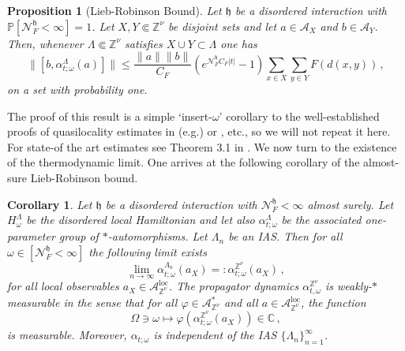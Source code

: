 \documentclass{article}
\newcommand{\calN}{\mathcal{N}^{\mathfrak{h}}_F}
\newcommand{\Znu}{\mathbb{Z}^\nu}
\newcommand{\C}{\mathbb C}
\newcommand{\A}{\mathcal{A}}
\renewcommand{\P}{\mathbb{P}}
\DeclareMathOperator{\loc}{loc}
\newcommand{\aloc}{\mathcal{A}_{\mathbb{Z}^\nu}^{\loc}}
\newcommand{\<}{\langle}
\renewcommand{\>}{\rangle}
\newcommand{\h}{\mathfrak{h}}
\newtheorem{prop}[thm]{Proposition}
\newtheorem{cor}[thm]{Corollary}
\theoremstyle{definition}
\numberwithin{equation}{section}
\begin{document}
\begin{prop}[Lieb-Robinson Bound]\label{prop:disordered_LRB}
    Let $\h$ be a disordered interaction with $\P[\calN<\infty]=1$. Let $X,Y\Subset \Znu$ be disjoint sets and let $a\in \A_{X}$ and $b\in \A_{Y}$. Then, whenever $\Lambda \Subset \Znu$ satisfies $X\cup Y\subset \Lambda$ one has 
    \begin{equation}
        \|[b, \alpha^{\Lambda}_{t;\omega}(a)]\| \le \frac{\|a\| \|b\| }{C_F} (e^{\calN C_F |t| }-1 )\sum_{x\in X} \sum_{y\in Y} F(d(x,y))\,,
    \end{equation} on a set with probability one.
\end{prop}
 The proof of this result is a simple `insert-$\omega$' corollary to the well-established proofs of quasilocality estimates in (e.g.) \cite[Theorem 1]{NachtergaeleOgataSims} or \cite[Theorem 2]{NachtergaeleVershyninaZagrebnov}, etc., so we will not repeat it here. For state-of the art estimates see Theorem 3.1 in \cite{NachtergaeleSimsYoung}. We now turn to the existence of the thermodynamic limit. One arrives at the following corollary of the almost-sure Lieb-Robinson bound.
\begin{cor}\label{cor:Thermo_AS}
    Let $\h$ be a disordered interaction with $\calN<\infty$ almost surely. Let $H^{\Lambda}_\omega$ be the disordered local Hamiltonian and let also $\alpha^{\Lambda}_{t;\omega}$ be the associated one-parameter group of $*$-automorphisms. Let $\Lambda_n$ be an IAS. Then for all $\omega \in [\calN<\infty]$ the following limit exists 
        \begin{equation}
            \lim_{n\to \infty} \alpha^{\Lambda_n}_{t;\omega} (a_X) =: \alpha^{\Znu}_{t;\omega}(a_X)\,,
        \end{equation} for all local observables $a_X\in \aloc$. The propagator dynamics $\alpha^{\Znu}_{t,\omega}$ is weakly-$\ast$ measurable in the sense that for all $\varphi \in \A_{\Znu}^*$ and all $a\in \aloc$, the function 
        \[
            \Omega \ni \omega \mapsto \varphi(\alpha^{\Znu}_{t;\omega}(a_X))\in \C\,,
        \] is measurable. Moreover, $\alpha_{t;\omega}$ is independent of the IAS $\{\Lambda_n\}_{n=1}^\infty$. 
\end{cor}
\end{document}

